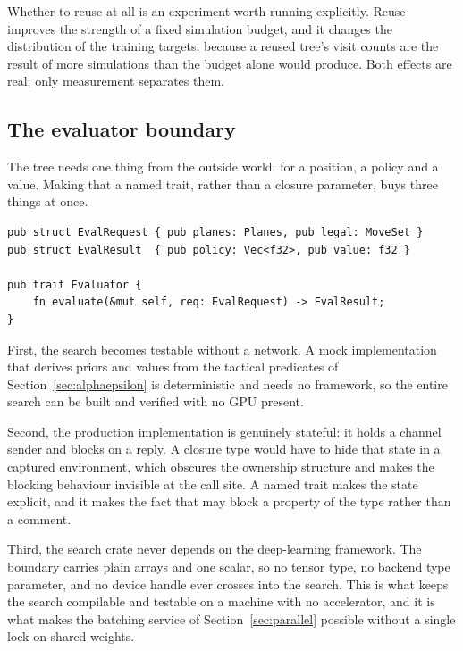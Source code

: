 Whether to reuse at all is an experiment worth running explicitly. Reuse
improves the strength of a fixed simulation budget, and it changes the
distribution of the training targets, because a reused tree's visit counts are
the result of more simulations than the budget alone would produce. Both effects
are real; only measurement separates them.

\subsection{The evaluator boundary}
\label{sec:evaluator}

The tree needs one thing from the outside world: for a position, a policy and a
value. Making that a named trait, rather than a closure parameter, buys three
things at once.

\begin{lstlisting}[style=rust,caption={The whole coupling between search and
network. Plain data in, plain data out.},label={lst:evaluator}]
pub struct EvalRequest { pub planes: Planes, pub legal: MoveSet }
pub struct EvalResult  { pub policy: Vec<f32>, pub value: f32 }

pub trait Evaluator {
    fn evaluate(&mut self, req: EvalRequest) -> EvalResult;
}
\end{lstlisting}

First, the search becomes testable without a network. A mock implementation that
derives priors and values from the tactical predicates of
Section~\ref{sec:alphaepsilon} is deterministic and needs no framework, so the
entire search can be built and verified with no GPU present.

Second, the production implementation is genuinely stateful: it holds a channel
sender and blocks on a reply. A closure type would have to hide that state in a
captured environment, which obscures the ownership structure and makes the
blocking behaviour invisible at the call site. A named trait makes the state
explicit, and it makes the fact that  may block a property of the
type rather than a comment.

Third, the search crate never depends on the deep-learning framework. The
boundary carries plain arrays and one scalar, so no tensor type, no backend type
parameter, and no device handle ever crosses into the search. This is what keeps
the search compilable and testable on a machine with no accelerator, and it is
what makes the batching service of Section~\ref{sec:parallel} possible without a
single lock on shared weights.

